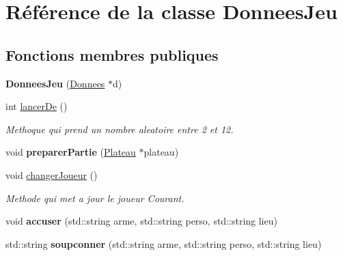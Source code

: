 \hypertarget{classDonneesJeu}{\section{\-Référence de la classe \-Donnees\-Jeu}
\label{classDonneesJeu}
}
\subsection*{\-Fonctions membres publiques}
\begin{DoxyCompactItemize}
\item 
\hypertarget{classDonneesJeu_a8481b1b72ec382f7c5b34d564bd6a39c}{{\bfseries \-Donnees\-Jeu} (\hyperlink{classDonnees}{\-Donnees} $\ast$d)}\label{classDonneesJeu_a8481b1b72ec382f7c5b34d564bd6a39c}

\item 
int \hyperlink{classDonneesJeu_a39169eecf0e197ccf5677c7a1602a172}{lancer\-De} ()
\begin{DoxyCompactList}\small\item\em \-Methoque qui prend un nombre aleatoire entre 2 et 12. \end{DoxyCompactList}\item 
\hypertarget{classDonneesJeu_aa8f22aa69faeb3e54d76a5aaa3d4444f}{void {\bfseries preparer\-Partie} (\hyperlink{classPlateau}{\-Plateau} $\ast$plateau)}\label{classDonneesJeu_aa8f22aa69faeb3e54d76a5aaa3d4444f}

\item 
void \hyperlink{classDonneesJeu_ae443a7d34f88fe863914746b6e1fefd9}{changer\-Joueur} ()
\begin{DoxyCompactList}\small\item\em \-Methode qui met a jour le joueur \-Courant. \end{DoxyCompactList}\item 
\hypertarget{classDonneesJeu_a0329e6f5906aca754330ee17d7b4ab56}{void {\bfseries accuser} (std\-::string arme, std\-::string perso, std\-::string lieu)}\label{classDonneesJeu_a0329e6f5906aca754330ee17d7b4ab56}

\item 
\hypertarget{classDonneesJeu_a5db87f4ec8d3d5b790ec58b6b17931e1}{std\-::string {\bfseries soupconner} (std\-::string arme, std\-::string perso, std\-::string lieu)}\label{classDonneesJeu_a5db87f4ec8d3d5b790ec58b6b17931e1}


\end{DoxyCompactItemize}
